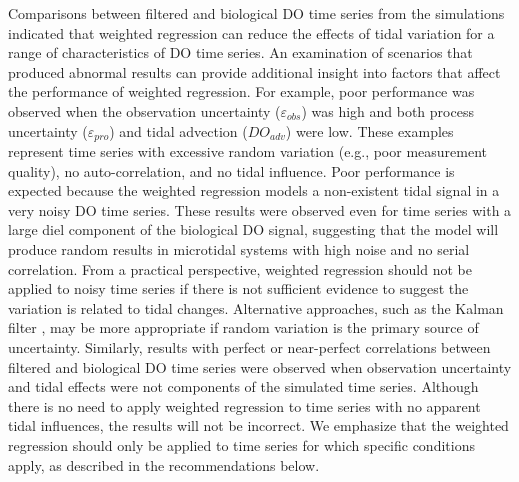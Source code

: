 \documentclass[letterpaper,12pt,oneside]{article}\usepackage[]{graphicx}\usepackage[]{color}
\begin{document}
Comparisons between filtered and biological \ac{DO} time series from the simulations indicated that weighted regression can reduce the effects of tidal variation for a range of characteristics of \ac{DO} time series.  An examination of scenarios that produced abnormal results can provide additional insight into factors that affect the performance of weighted regression.  For example, poor performance was observed when the observation uncertainty ($\varepsilon_{obs}$) was high and both process uncertainty ($\varepsilon_{pro}$) and tidal advection ($DO_{adv}$) were low.  These examples represent time series with excessive random variation (e.g., poor measurement quality), no auto-correlation, and no tidal influence.  Poor performance is expected because the weighted regression models a non-existent tidal signal in a very noisy \ac{DO} time series.  These results were observed even for time series with a large diel component of the biological \ac{DO} signal, suggesting that the model will produce random results in microtidal systems with high noise and no serial correlation.  From a practical perspective, weighted regression should not be applied to noisy time series if there is not sufficient evidence to suggest the variation is related to tidal changes.  Alternative approaches, such as the Kalman filter \citep{Harvey89,Batt12}, may be more appropriate if random variation is the primary source of uncertainty.  Similarly, results with perfect or near-perfect correlations between filtered and biological \ac{DO} time series were observed when observation uncertainty and tidal effects were not components of the simulated time series.  Although there is no need to apply weighted regression to time series with no apparent tidal influences, the results will not be incorrect.  We emphasize that the weighted regression should only be applied to time series for which specific conditions apply, as described in the recommendations below.  
\end{document}

